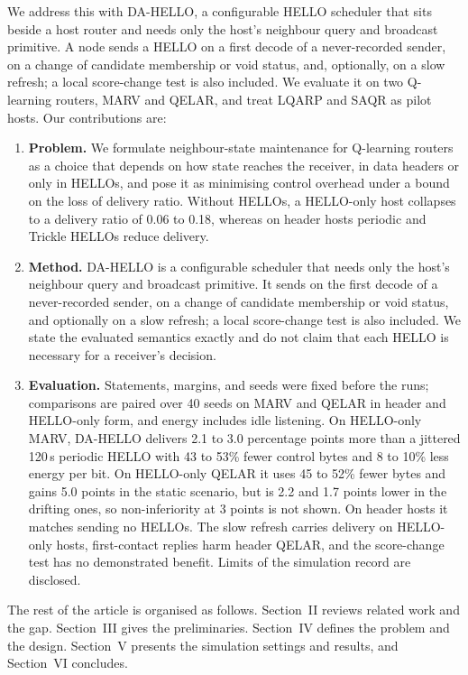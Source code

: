 We address this with DA-HELLO, a configurable HELLO scheduler that sits beside a host router and needs only the host's neighbour query and broadcast primitive. A node sends a HELLO on a first decode of a never-recorded sender, on a change of candidate membership or void status, and, optionally, on a slow refresh; a local score-change test is also included. We evaluate it on two Q-learning routers, MARV and QELAR, and treat LQARP and SAQR as pilot hosts. Our contributions are:
\begin{enumerate}
\item \textbf{Problem.} We formulate neighbour-state maintenance for Q-learning routers as a choice that depends on how state reaches the receiver, in data headers or only in HELLOs, and pose it as minimising control overhead under a bound on the loss of delivery ratio. Without HELLOs, a HELLO-only host collapses to a delivery ratio of 0.06 to 0.18, whereas on header hosts periodic and Trickle HELLOs reduce delivery.
\item \textbf{Method.} DA-HELLO is a configurable scheduler that needs only the host's neighbour query and broadcast primitive. It sends on the first decode of a never-recorded sender, on a change of candidate membership or void status, and optionally on a slow refresh; a local score-change test is also included. We state the evaluated semantics exactly and do not claim that each HELLO is necessary for a receiver's decision.
\item \textbf{Evaluation.} Statements, margins, and seeds were fixed before the runs; comparisons are paired over 40 seeds on MARV and QELAR in header and HELLO-only form, and energy includes idle listening. On HELLO-only MARV, DA-HELLO delivers 2.1 to 3.0 percentage points more than a jittered 120\,s periodic HELLO with 43 to 53\% fewer control bytes and 8 to 10\% less energy per bit. On HELLO-only QELAR it uses 45 to 52\% fewer bytes and gains 5.0 points in the static scenario, but is 2.2 and 1.7 points lower in the drifting ones, so non-inferiority at 3 points is not shown. On header hosts it matches sending no HELLOs. The slow refresh carries delivery on HELLO-only hosts, first-contact replies harm header QELAR, and the score-change test has no demonstrated benefit. Limits of the simulation record are disclosed.
\end{enumerate}
The rest of the article is organised as follows. Section~II reviews related work and the gap. Section~III gives the preliminaries. Section~IV defines the problem and the design. Section~V presents the simulation settings and results, and Section~VI concludes.
